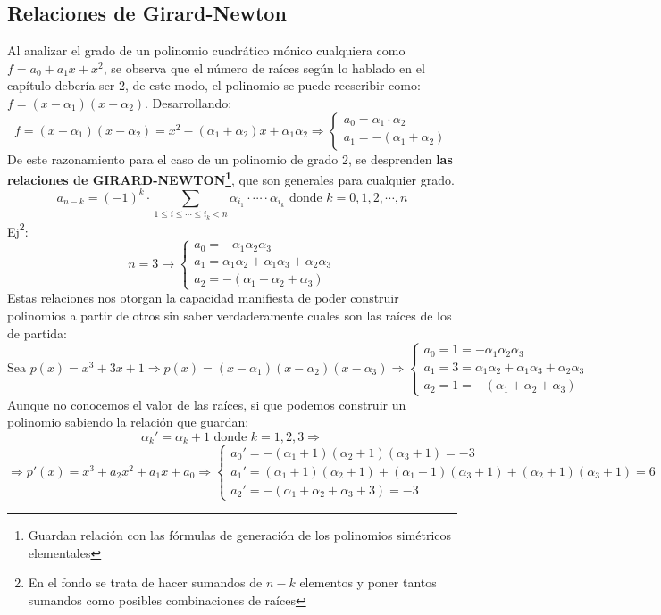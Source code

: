 \documentclass[10pt,a4paper,openright]{book}
\theoremstyle{break}
\begin{document}
\subsection{Relaciones de Girard-Newton}
Al analizar el grado de un polinomio cuadrático mónico cualquiera como $f=a_0+a_1x+x^2$, se observa que el número de raíces según lo hablado en el capítulo debería ser 2, de este modo, el polinomio se puede reescribir como: $f=(x-\alpha_1)(x-\alpha_2)$. Desarrollando:
$$f=(x-\alpha_1)(x-\alpha_2)=x^2-(\alpha_1+\alpha_2)x+\alpha_1\alpha_2\Rightarrow\begin{cases}a_0=\alpha_1\cdot \alpha_2 \\
a_1=-(\alpha_1+\alpha_2)\end{cases}$$
De este razonamiento para el caso de un polinomio de grado 2, se desprenden \textbf{las relaciones de GIRARD-NEWTON\footnote{Guardan relación con las fórmulas de generación de los polinomios simétricos elementales}}, que son generales para cualquier grado.
$$a_{n-k}=(-1)^k\cdot \sum_{1\leq i\leq \cdots \leq i_k<n}\alpha_{i_1}\cdot \cdots \cdot \alpha_{i_k}\mbox{ donde }k=0,1,2, \cdots, n$$
Ej\footnote{En el fondo se trata de hacer sumandos de $n-k$ elementos y poner tantos sumandos como posibles combinaciones de raíces}:
$$n=3\rightarrow \begin{cases} a_0=-\alpha_1\alpha_2\alpha_3 \\
a_1=\alpha_1\alpha_2+ \alpha_1\alpha_3+ \alpha_2\alpha_3 \\
a_2=-(\alpha_1+\alpha_2+\alpha_3)
\end{cases}$$
Estas relaciones nos otorgan la capacidad manifiesta de poder  construir polinomios a partir de otros sin saber verdaderamente cuales son las raíces de los de partida:
$$\mbox{Sea }p(x)=x^3+3x+1\Rightarrow p(x)=(x-\alpha_1)(x-\alpha_2)(x-\alpha_3)\Rightarrow
\begin{cases}
a_0=1=-\alpha_1\alpha_2\alpha_3 \\
a_1=3=\alpha_1\alpha_2+\alpha_1\alpha_3+\alpha_2\alpha_3 \\
a_2=1=-(\alpha_1+\alpha_2+\alpha_3)
\end{cases}$$
Aunque no conocemos el valor de las raíces, si que podemos construir un polinomio sabiendo la relación que guardan:
$$\alpha_k'=\alpha_k+1\mbox{ donde }k=1,2,3\Rightarrow$$
$$\Rightarrow p'(x)=x^3+a_2x^2+a_1x+a_0\Rightarrow
\begin{cases}
a_0'=-(\alpha_1+1)(\alpha_2+1)(\alpha_3+1)=-3 \\
a_1'=(\alpha_1+1)(\alpha_2+1)+(\alpha_1+1)(\alpha_3+1)+(\alpha_2+1)(\alpha_3+1)=6 \\
a_2'=-(\alpha_1+\alpha_2+\alpha_3+3)=-3
\end{cases}$$
\end{document}
